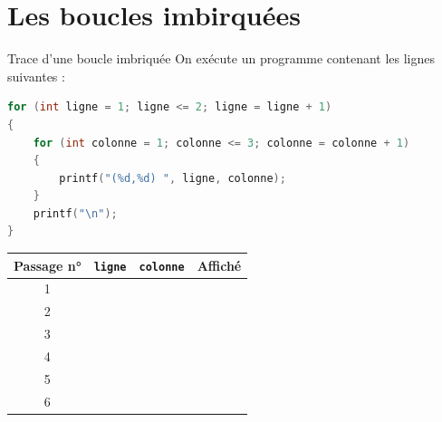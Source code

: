 \section{Les boucles imbirquées}

\begin{UPSTIexercice}{Trace d'une boucle imbriquée}
    On exécute un programme contenant les lignes suivantes : 
    \begin{lstlisting}[language=C]
for (int ligne = 1; ligne <= 2; ligne = ligne + 1)
{
    for (int colonne = 1; colonne <= 3; colonne = colonne + 1)
    {
        printf("(%d,%d) ", ligne, colonne);
    }
    printf("\n");
}
\end{lstlisting}

    \begin{center}
        \begin{tabular}{|c|c|c|c|}
            \hline
            \textbf{Passage n°} & \texttt{ligne} & \texttt{colonne} & \textbf{Affiché} \\
            \hline
            1 & & & \\[0.3cm]
            \hline
            2 & & & \\[0.3cm]
            \hline
            3 & & & \\[0.3cm]
            \hline
            4 & & & \\[0.3cm]
            \hline
            5 & & & \\[0.3cm]
            \hline
            6 & & & \\[0.3cm]
            \hline
        \end{tabular}
    \end{center}
\end{UPSTIexercice}

